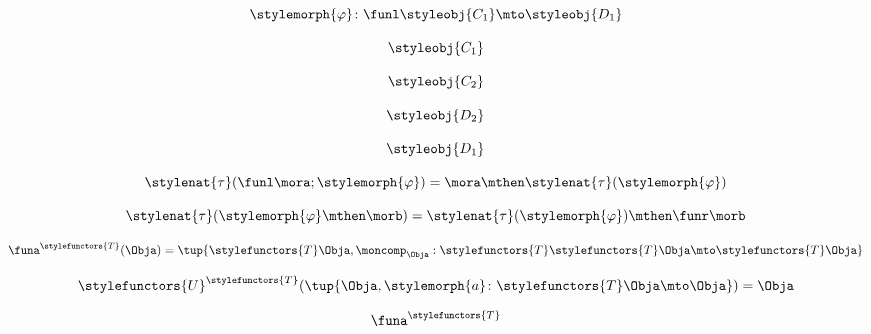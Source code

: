 {\begin{forslides}
    \begin{equation}
        \label{eq:slides_adjunctions_73}
        \stylemorph{\varphi} \colon \funl \styleobj{C_1} \mto \styleobj{D_1}
    \end{equation}

    \begin{equation}
        \label{eq:slides_adjunctions_74}
        \styleobj{C_1}
    \end{equation}

    \begin{equation}
        \label{eq:slides_adjunctions_75}
        \styleobj{C_2}
    \end{equation}

    \begin{equation}
        \label{eq:slides_adjunctions_76}
        \styleobj{D_2}
    \end{equation}

    \begin{equation}
        \label{eq:slides_adjunctions_77}
        \styleobj{D_1}
    \end{equation}

    \begin{equation}
        \label{eq:slides_adjunctions_78}
        \stylenat{\tau} (\funl \mora; \stylemorph{\varphi}) = \mora \mthen \stylenat{\tau}(\stylemorph{\varphi})
    \end{equation}

    \begin{equation}
        \label{eq:slides_adjunctions_79}
        \stylenat{\tau} (\stylemorph{\varphi} \mthen \morb) =  \stylenat{\tau}(\stylemorph{\varphi}) \mthen \funr \morb
    \end{equation}

    \begin{equation}
        \label{eq:slides_adjunctions_80}
        \funa^{\stylefunctors{T}}(\Obja) = \tup{ \stylefunctors{T} \Obja, \moncomp_{\Obja} : \stylefunctors{T} \stylefunctors{T} \Obja \mto \stylefunctors{T} \Obja}
    \end{equation}

    \begin{equation}
        \label{eq:slides_adjunctions_81}
        \stylefunctors{U}^{\stylefunctors{T}}( \tup{\Obja, \stylemorph{a} \colon \stylefunctors{T} \Obja \mto \Obja}) = \Obja
    \end{equation}

    \begin{equation}
        \label{eq:slides_adjunctions_82}
        \funa^{\stylefunctors{T}}
    \end{equation}


\end{forslides}}
